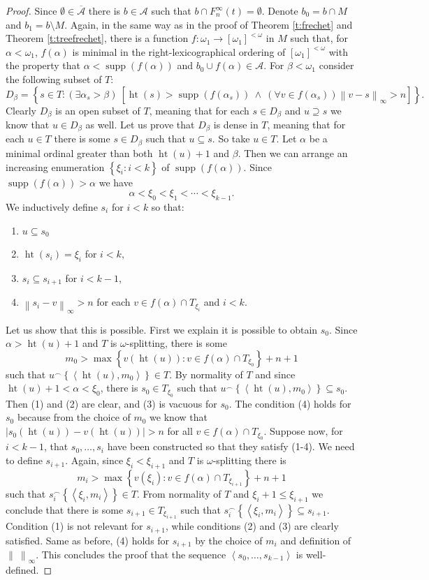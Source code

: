 \documentclass{amsart}
\theoremstyle{plain}
\theoremstyle{definition}
\numberwithin{equation}{section}
\renewcommand{\a}{\alpha}
\renewcommand{\b}{\beta}
\renewcommand{\o}{\omega}
\newcommand{\ps}{\emptyset}
\newcommand{\sst}{\subseteq}
\newcommand{\seq}[1]{\left<#1\right>}
\newcommand{\set}[1]{\left\{#1\right\}}
\newcommand{\abs}[1]{\left\vert#1\right\vert}
\newcommand{\norm}[1]{\left\lVert#1\right\rVert_{\infty}}
\newcommand{\supp}{\operatorname{supp}}
\newcommand{\h}{\operatorname{ht}}
\begin{document}
\begin{proof}
	Since $\ps\in\overline{\mathcal A}$ there is $b\in \mathcal A$ such that $b\cap F^{\infty}_n(t)=\ps$.
	Denote $b_0=b\cap M$ and $b_1=b\setminus M$.
	Again, in the same way as in the proof of Theorem \ref{t:frechet} and Theorem \ref{t:treefrechet}, there is a function $f:\o_1\to [\o_1]^{<\o}$ in $M$ such that, for $\a<\o_1$, $f(\a)$ is minimal in the right-lexicographical ordering of $[\o_1]^{<\o}$ with the property that $\a<\supp(f(\a))$ and $b_0\cup f(\a)\in\mathcal A$.
	For $\b<\o_1$ consider the following subset of $T$:
	$$D_{\b}=\set{s\in T:(\exists \a_s>\b)\ \left[\h(s)>\supp(f(\a_s))\ \wedge\ (\forall v\in f(\a_s))\norm{v-s}>n\right]}.$$
	Clearly $D_{\b}$ is an open subset of $T$, meaning that for each $s\in D_{\b}$ and $u\supseteq s$ we know that $u\in D_{\b}$ as well.
	Let us prove that $D_{\b}$ is dense in $T$, meaning that for each $u\in T$ there is some $s\in D_{\b}$ such that $u\sst s$.
	So take $u\in T$.
	Let $\a$ be a minimal ordinal greater than both $\h(u)+1$ and $\b$.
	Then we can arrange an increasing enumeration $\set{\xi_i:i<k}$ of $\supp(f(\a))$.
	Since $\supp(f(\a))>\a$ we have $$\a<\xi_0<\xi_1<\cdots<\xi_{k-1}.$$
	We inductively define $s_i$ for $i<k$ so that:
	\begin{enumerate}
		\item $u\sst s_0$
		\item $\h(s_i)=\xi_i$ for $i<k$,
		\item $s_i\sst s_{i+1}$ for $i<k-1$,
		\item $\norm{s_i-v}>n$ for each $v\in f(\a)\cap T_{\xi_i}$ and $i<k$.
	\end{enumerate}
	Let us show that this is possible.
	First we explain it is possible to obtain $s_0$.
	Since $\a>\h(u)+1$ and $T$ is $\o$-splitting, there is some $$m_0>\max\set{v(\h(u)):v\in f(\a)\cap T_{\xi_0}}+n+1$$ such that $u^\frown\set{\seq{\h(u),m_0}}\in T$.
	By normality of $T$ and since $\h(u)+1<\a<\xi_0$, there is $s_0\in T_{\xi_0}$ such that $u^{\frown}\set{\seq{\h(u),m_0}}\sst s_0$.
	Then (1) and (2) are clear, and (3) is vacuous for $s_0$.
	The condition (4) holds for $s_0$ because from the choice of $m_0$ we know that $\abs{s_0(\h(u))-v(\h(u))}>n$ for all $v\in f(\a)\cap T_{\xi_0}$.
	Suppose now, for $i<k-1$, that $s_0,\dots,s_i$ have been constructed so that they satisfy (1-4).
	We need to define $s_{i+1}$.
	Again, since $\xi_i<\xi_{i+1}$ and $T$ is $\o$-splitting there is $$m_i>\max\set{v(\xi_i):v\in f(\a)\cap T_{\xi_{i+1}}}+n+1$$ such that $s_i^{\frown}\set{\seq{\xi_i,m_i}}\in T$.
	From normality of $T$ and $\xi_i+1\le\xi_{i+1}$ we conclude that there is some $s_{i+1}\in T_{\xi_{i+1}}$ such that $s_i^{\frown}\set{\seq{\xi_i,m_i}}\sst s_{i+1}$.
	Condition (1) is not relevant for $s_{i+1}$, while conditions (2) and (3) are clearly satisfied. 
	Same as before, (4) holds for $s_{i+1}$ by the choice of $m_i$ and definition of $\norm{\ }$.
	This concludes the proof that the sequence $\seq{s_0,\dots,s_{k-1}}$ is well-defined.


\end{proof}
\end{document}
